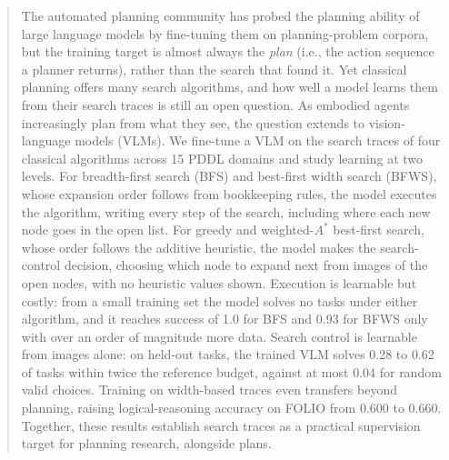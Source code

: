 \begin{abstract}
The automated planning community has probed the planning ability of large language models by fine-tuning them on planning-problem corpora, but the training target is almost always the \emph{plan} (i.e., the action sequence a planner returns), rather than the search that found it. Yet classical planning offers many search algorithms, and how well a model learns them from their search traces is still an open question. As embodied agents increasingly plan from what they see, the question extends to vision-language models (VLMs). We fine-tune a VLM on the search traces of four classical algorithms across 15 PDDL domains and study learning at two levels. For breadth-first search (BFS) and best-first width search (BFWS), whose expansion order follows from bookkeeping rules, the model executes the algorithm, writing every step of the search, including where each new node goes in the open list. For greedy and weighted-$A^*$ best-first search, whose order follows the additive heuristic, the model makes the search-control decision, choosing which node to expand next from images of the open nodes, with no heuristic values shown. Execution is learnable but costly: from a small training set the model solves no tasks under either algorithm, and it reaches success of 1.0 for BFS and 0.93 for BFWS only with over an order of magnitude more data. Search control is learnable from images alone: on held-out tasks, the trained VLM solves 0.28 to 0.62 of tasks within twice the reference budget, against at most 0.04 for random valid choices. Training on width-based traces even transfers beyond planning, raising logical-reasoning accuracy on FOLIO from 0.600 to 0.660. Together, these results establish search traces as a practical supervision target for planning research, alongside plans.
\end{abstract}
